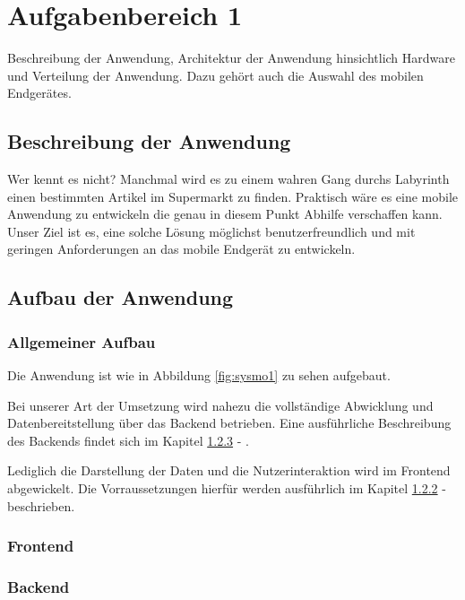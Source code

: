 \section{Aufgabenbereich 1}
Beschreibung der Anwendung, Architektur der Anwendung hinsichtlich Hardware und Verteilung der Anwendung.
Dazu gehört auch die Auswahl des mobilen Endgerätes.

\subsection{Beschreibung der Anwendung}
Wer kennt es nicht? Manchmal wird es zu einem wahren Gang durchs Labyrinth einen bestimmten Artikel im Supermarkt zu finden.
Praktisch wäre es eine mobile Anwendung zu entwickeln die genau in diesem Punkt Abhilfe verschaffen kann.
Unser Ziel ist es, eine solche Lösung möglichst benutzerfreundlich und mit geringen Anforderungen an das mobile Endgerät zu entwickeln. 



\subsection{Aufbau der Anwendung}
\subsubsection{Allgemeiner Aufbau}
Die Anwendung ist wie in Abbildung \ref{fig:sysmo1} zu sehen aufgebaut. 


Bei unserer Art der Umsetzung wird nahezu die vollständige 
Abwicklung und Datenbereitstellung über das Backend betrieben.
Eine ausführliche Beschreibung des Backends findet sich im Kapitel \ref{sec:backend} - .

Lediglich die Darstellung der Daten und die Nutzerinteraktion wird im Frontend abgewickelt.
Die Vorraussetzungen hierfür werden ausführlich im Kapitel \ref{sec:frontend} -  beschrieben.

\subsubsection{Frontend}
\label{sec:frontend}
\subsubsection{Backend}
\label{sec:backend}

